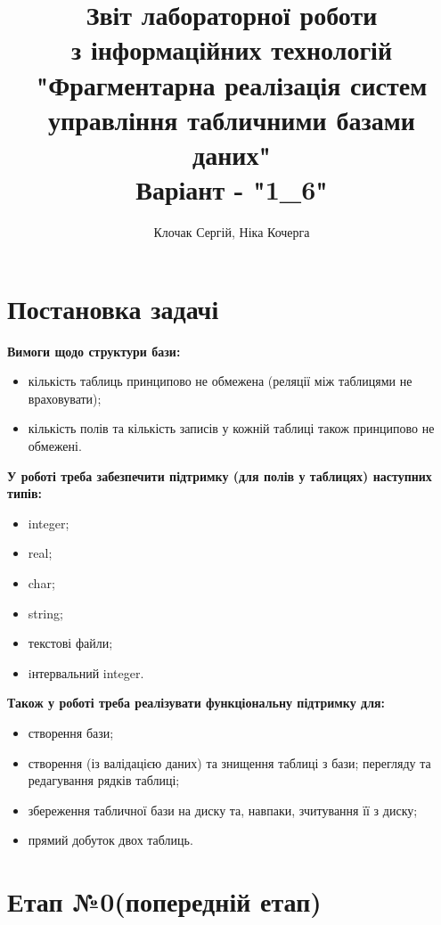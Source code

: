 \documentclass[a4paper, 12pt]{article}
\author{Клочак Сергій, Ніка Кочерга}
\title{Звіт лабораторної роботи\\
       з інформаційних технологій\\
       "Фрагментарна реалізація систем управління табличними базами даних"\\
       Варіант - "1\_6"}
\begin{document}
\maketitle

\newpage

\tableofcontents

\newpage

\section{Постановка задачі}

\textbf{Вимоги щодо структури бази:}

\begin{itemize}
\item кількість таблиць принципово не обмежена (реляції між таблицями не враховувати);
\item кількість полів та кількість записів у кожній таблиці також принципово не обмежені.
\end{itemize}


\textbf{У роботі треба забезпечити підтримку (для полів у таблицях) наступних типів:}

\begin{itemize}
\item integer;
\item real;
\item char;
\item string;
\item текстові файли;
\item iнтервальний integer.
\end{itemize}

\textbf{Також у роботі треба реалізувати функціональну підтримку для:}

\begin{itemize}
\item створення бази;
\item створення (із валідацією даних) та знищення таблиці з бази;
перегляду та редагування рядків таблиці;
\item збереження табличної бази на диску та, навпаки, зчитування її з диску;
\item прямий добуток двох таблиць.
\end{itemize}

\section{Етап №0(попередній етап)}
\end{document}
